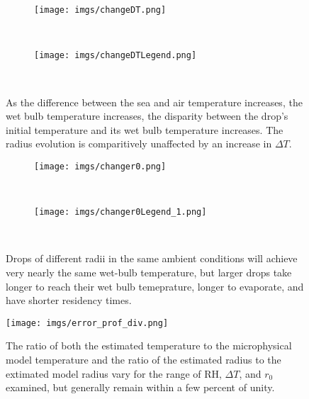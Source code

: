 \documentclass[10pt,a4paper]{article}
\begin{document}
\begin{figure}[h!]
    \centering
    \begin{subfigure}[t!]{0.75\textwidth}
        \texttt{[image: imgs/changeDT.png]}        
    \end{subfigure}
    ~ %
    \begin{subfigure}[t!]{0.23\textwidth}
        \texttt{[image: imgs/changeDTLegend.png]}        
    \end{subfigure}
    ~ %
       \caption{As the difference between the sea and air temperature increases, the wet bulb temperature increases, the disparity between the drop's initial temperature and its wet bulb temperature increases. The radius evolution is comparitively unaffected by an increase in $\Delta T$.\label{fig:changeDT}}
\end{figure}

\begin{figure}[h!]
    \centering
    \begin{subfigure}[t!]{0.75\textwidth}
        \texttt{[image: imgs/changer0.png]}        
    \end{subfigure}
    ~ %
    \begin{subfigure}[t!]{0.2\textwidth}
        \texttt{[image: imgs/changer0Legend\_1.png]}        
    \end{subfigure}
    ~ %
       \caption{Drops of different radii in the same ambient conditions will achieve very nearly the same wet-bulb temperature, but larger drops take longer to reach their wet bulb temeprature, longer to evaporate, and have shorter residency times. \label{fig:changer0}}
\end{figure}

\begin{figure}[h!]
    \centering
        \texttt{[image: imgs/error\_prof\_div.png]}        
       \caption{The ratio of both the estimated temperature to the microphysical model temperature and the ratio of the estimated radius to the extimated model radius vary for the range of RH, $\Delta T$, and $r_0$ examined, but generally remain within a few percent of unity. \label{fig:error_prof_div}}
\end{figure}
\end{document}
